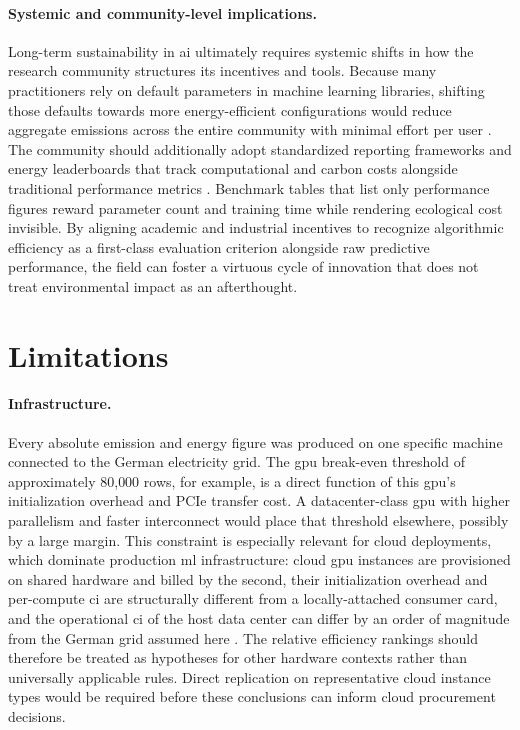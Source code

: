 \paragraph{Systemic and community-level implications.}
Long-term sustainability in \gls{ai} ultimately requires systemic shifts in how the research community structures its incentives and tools. Because many practitioners rely on default parameters in machine learning libraries, shifting those defaults towards more energy-efficient configurations would reduce aggregate emissions across the entire community with minimal effort per user \cite{hendersonSystematicReportingEnergy2020}. The community should additionally adopt standardized reporting frameworks and energy leaderboards that track computational and carbon costs alongside traditional performance metrics \cite{pattersonCarbonEmissionsLarge2021}. Benchmark tables that list only performance figures reward parameter count and training time while rendering ecological cost invisible. By aligning academic and industrial incentives to recognize algorithmic efficiency as a first-class evaluation criterion alongside raw predictive performance, the field can foster a virtuous cycle of innovation that does not treat environmental impact as an afterthought.



\section{Limitations}
\label{sec:limitations}

\paragraph{Infrastructure.}
Every absolute emission and energy figure was produced on one specific machine connected to the German electricity grid. The \gls{gpu} break-even threshold of approximately 80{,}000 rows, for example, is a direct function of this \gls{gpu}'s initialization overhead and PCIe transfer cost. A datacenter-class \gls{gpu} with higher parallelism and faster interconnect would place that threshold elsewhere, possibly by a large margin. This constraint is especially relevant for cloud deployments, which dominate production \gls{ml} infrastructure: cloud \gls{gpu} instances are provisioned on shared hardware and billed by the second, their initialization overhead and per-compute \gls{ci} are structurally different from a locally-attached consumer card, and the operational \gls{ci} of the host data center can differ by an order of magnitude from the German grid assumed here \cite{hendersonSystematicReportingEnergy2020}. The relative efficiency rankings should therefore be treated as hypotheses for other hardware contexts rather than universally applicable rules. Direct replication on representative cloud instance types would be required before these conclusions can inform cloud procurement decisions.

